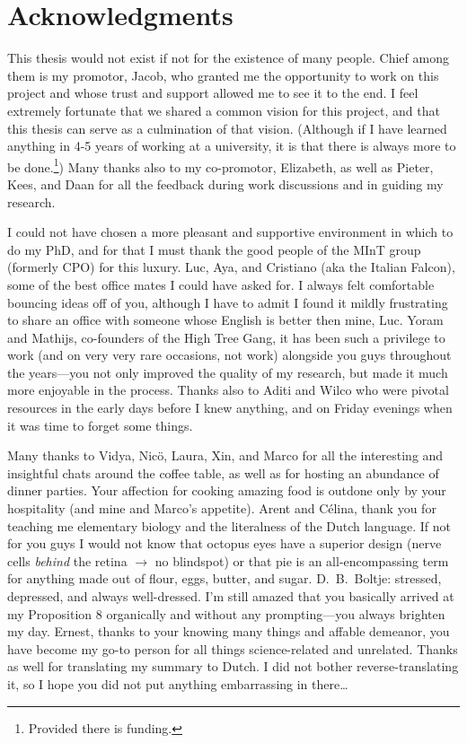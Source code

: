 \chapter*{Acknowledgments}
\setcounter{footnote}{0} 


This thesis would not exist if not for the existence of many people. Chief among them is my promotor, Jacob, who granted me the opportunity to work on this project and whose trust and support allowed me to see it to the end. I feel extremely fortunate that we shared a common vision for this project, and that this thesis can serve as a culmination of that vision. (Although if I have learned anything in 4-5 years of working at a university, it is that there is always more to be done.\footnote{Provided there is funding.}) Many thanks also to my co-promotor, Elizabeth, as well as Pieter, Kees, and Daan for all the feedback during work discussions and in guiding my research.

I could not have chosen a more pleasant and supportive environment in which to do my PhD, and for that I must thank the good people of the MInT group (formerly CPO) for this luxury. Luc, Aya, and Cristiano (aka the Italian Falcon), some of the best office mates I could have asked for. I always felt comfortable bouncing ideas off of you, although I have to admit I found it mildly frustrating to share an office with someone whose English is better then mine, Luc. 
Yoram and Mathijs, co-founders of the High Tree Gang, it has been such a privilege to work (and on very very rare occasions, not work) alongside you guys throughout the years---you not only improved the quality of my research, but made it much more enjoyable in the process. Thanks also to Aditi and Wilco who were pivotal resources in the early days before I knew anything, and on Friday evenings when it was time to forget some things.

Many thanks to Vidya, Nicö, Laura, Xin, and Marco for all the interesting and insightful chats around the coffee table, as well as for hosting an abundance of dinner parties. Your affection for cooking amazing food is outdone only by your hospitality (and mine and Marco’s appetite). 
Arent and C\'elina, thank you for teaching me elementary biology and the literalness of the Dutch language. If not for you guys I would not know that octopus eyes have a superior design (nerve cells \textit{behind} the retina $\longrightarrow$ no blindspot) or that pie is an all-encompassing term for anything made out of flour, eggs, butter, and sugar. 
D.\ B.\ Boltje: stressed, depressed, and always well-dressed. I'm still amazed that you basically arrived at my Proposition 8 organically and without any prompting---you always brighten my day. 
Ernest, thanks to your knowing many things and affable demeanor, you have become my go-to person for all things science-related and unrelated. Thanks as well for translating my summary to Dutch. I did not bother reverse-translating it, so I hope you did not put anything embarrassing in there\ldots

